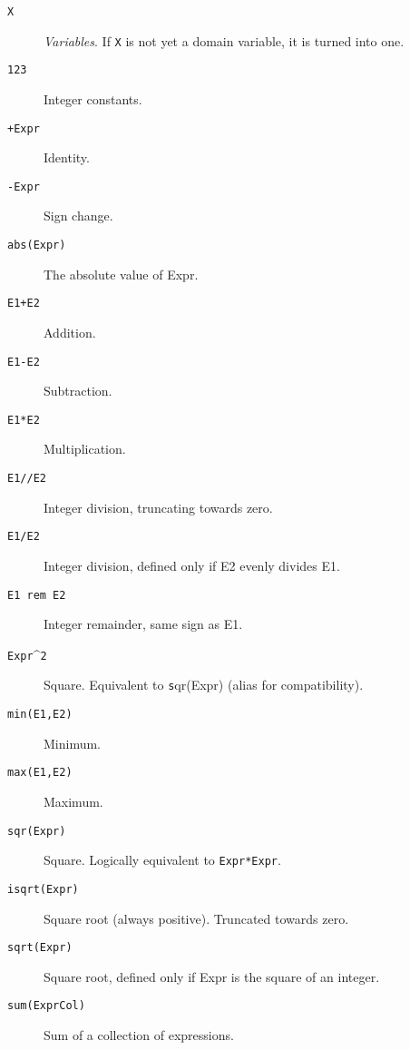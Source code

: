 \begin{description}
\item[\texttt{X}]
            \emph{Variables}.  If \verb'X' is not yet a domain variable, it is turned 
            into one.

\item[\texttt{123}]
            Integer constants.

\item[\texttt{+Expr}]
            Identity.

\item[\texttt{-Expr}]
            Sign change.

\item[\texttt{abs(Expr)}]
    The absolute value of Expr.

\item[\texttt{E1+E2}]
    Addition.

\item[\texttt{E1-E2}]
    Subtraction.

\item[\texttt{E1*E2}]
    Multiplication.

\item[\texttt{E1//E2}]
    Integer division, truncating towards zero.

\item[\texttt{E1/E2}]
    Integer division, defined only if E2 evenly divides E1.

\item[\texttt{E1 rem E2}]
            Integer remainder, same sign as E1.

\item[\texttt{Expr}\textasciicircum{}{\texttt 2}]
            Square. Equivalent to {\texttt sqr(Expr)} (alias for compatibility).


\item[\texttt{min(E1,E2)}]
    Minimum.

\item[\texttt{max(E1,E2)}]
    Maximum.

\item[\texttt{sqr(Expr)}]
    Square. Logically equivalent to \verb|Expr*Expr|.

\item[\texttt{isqrt(Expr)}]
            Square root (always positive). Truncated towards zero.

\item[\texttt{sqrt(Expr)}]
            Square root, defined only if Expr is the square of an integer.

\item[\texttt{sum(ExprCol)}]
            Sum of a collection of expressions.


\end{description}
